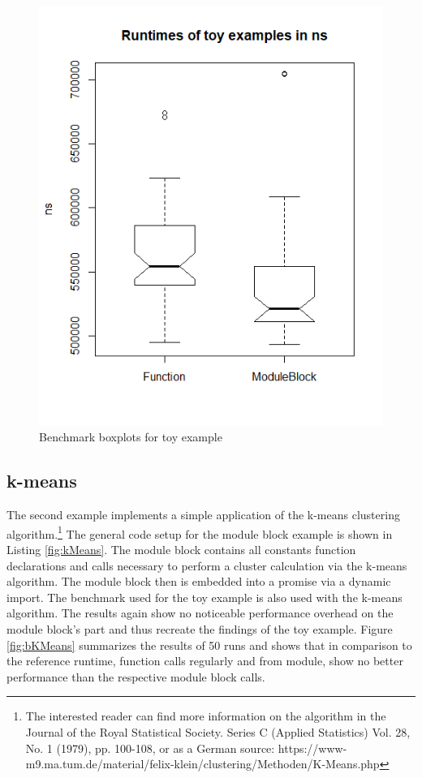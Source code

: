 \begin{figure}[h!]
    \centering
    \includegraphics[scale=0.7]{figures/runtimesToyBoxplot.png}
    \caption{Benchmark boxplots for toy example}
    \label{fig:bToy}
\end{figure}

\subsection{k-means}
The second example implements a simple application of the k-means clustering algorithm.\footnote{The interested reader can find more information on the algorithm in the Journal of the Royal Statistical Society. Series C (Applied Statistics) Vol. 28, No. 1 (1979), pp. 100-108, or as a German source:  https://www-m9.ma.tum.de/material/felix-klein/clustering/Methoden/K-Means.php}
The general code setup for the module block example is shown in Listing \ref{fig:kMeans}. The module block contains all constants function declarations and calls necessary to perform a cluster calculation via the k-means algorithm. The module block then is embedded into a promise via a dynamic import. The benchmark used for the toy example is also used with the k-means algorithm. The results again show no noticeable performance overhead on the module block's part and thus recreate the findings of the toy example. Figure \ref{fig:bKMeans} summarizes the results of 50 runs and shows that in comparison to the reference runtime, function calls regularly and from module, show no better performance than the respective module block calls.

